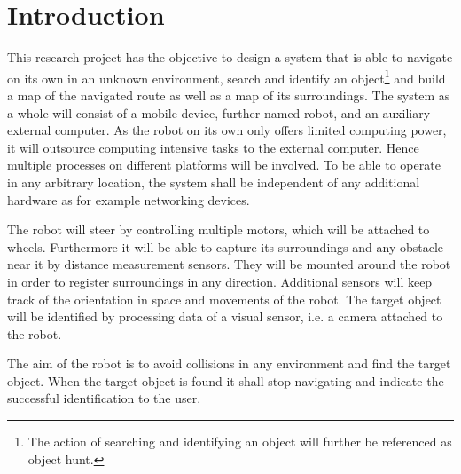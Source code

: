 \cleardoublepage
\pagestyle{fancy} %
\fancyhead{}
\fancyhf{}
\renewcommand{\headrulewidth}{0pt}
\renewcommand{\footrulewidth}{0.4pt}

\section{Introduction}

This research project has the objective to design a system that is able to navigate on its own in an unknown environment, search and identify an object\footnote{The action of searching and identifying an object will further be referenced as object hunt.} and build a map of the navigated route as well as a map of its surroundings. The system as a whole will consist of a mobile device, further named robot, and an auxiliary external computer. As the robot on its own only offers limited computing power, it will outsource computing intensive tasks to the external computer. Hence multiple processes on different platforms will be involved. To be able to operate in any arbitrary location, the system shall be independent of any additional hardware as for example networking devices.

The robot will steer by controlling multiple motors, which will be attached to wheels. Furthermore it will be able to capture its surroundings and any obstacle near it by distance measurement sensors. They will be mounted around the robot in order to register surroundings in any direction. Additional sensors will keep track of the orientation in space and movements of the robot. The target object will be identified by processing data of a visual sensor, i.e. a camera attached to the robot.

The aim of the robot is to avoid collisions in any environment and find the target object. When the target object is found it shall stop navigating and indicate the successful identification to the user.




